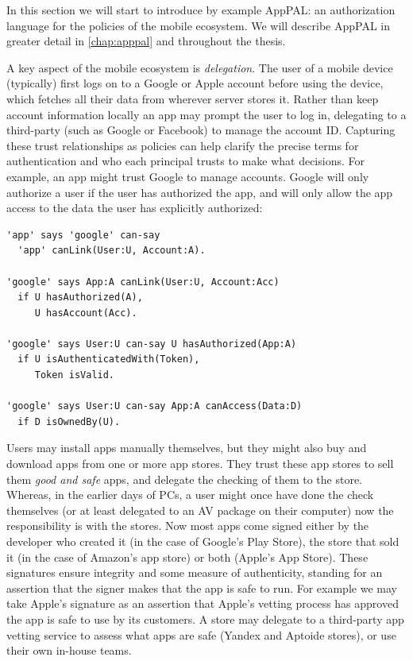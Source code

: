 \documentclass[thesis.tex]{subfiles}
\begin{document}
In this section we will start to introduce by example AppPAL: an authorization language for
the policies of the mobile ecosystem. We will describe AppPAL in greater detail
in \autoref{chap:apppal} and throughout the thesis. 

A key aspect of the mobile ecosystem is \emph{delegation}. The user of a mobile
device (typically) first logs on to a Google or Apple account before using the
device, which fetches all their data from wherever server stores it. Rather than
keep account information locally an app may prompt the user to log in,
delegating to a third-party (such as Google or Facebook) to manage the account
ID. Capturing these trust relationships as policies can help clarify the precise
terms for authentication and who each principal trusts to make what decisions.
For example, an app might trust Google to manage accounts. Google will only
authorize a user if the user has authorized the app, and will only allow the app
access to the data the user has explicitly authorized:
\begin{lstlisting}
'app' says 'google' can-say 
  'app' canLink(User:U, Account:A).

'google' says App:A canLink(User:U, Account:Acc)
  if U hasAuthorized(A),
     U hasAccount(Acc).

'google' says User:U can-say U hasAuthorized(App:A)
  if U isAuthenticatedWith(Token),
     Token isValid.

'google' says User:U can-say App:A canAccess(Data:D)
  if D isOwnedBy(U).
\end{lstlisting}

Users may install apps manually themselves, but they might also buy and download
apps from one or more app stores. They trust these app stores to sell them
\emph{good and safe} apps, and delegate the checking of them to the store.
Whereas, in the earlier days of PCs, a user might once have done the check
themselves (or at least delegated to an \ac{AV} package on their computer) now
the responsibility is with the stores. Now most apps come signed either by the
developer who created it (in the case of Google's Play Store), the store that
sold it (in the case of Amazon's app store) or both (Apple's App Store). These
signatures ensure integrity and some measure of authenticity, standing for an
assertion that the signer makes that the app is safe to run. For example we may
take Apple's signature as an assertion that Apple's vetting process has approved
the app is safe to use by its customers. A store may delegate to a third-party
app vetting service to assess what apps are safe (Yandex and Aptoide stores), or
use their own in-house teams.
\end{document}
